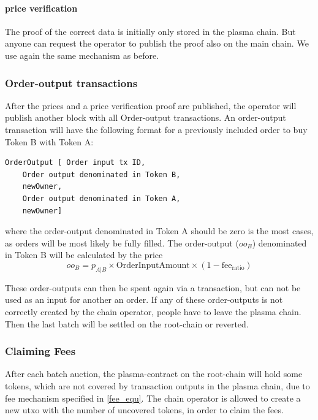 \documentclass[11pt,parskip=full]{scrartcl}%
\begin{document}
\paragraph{price verification}
The proof of the correct data is initially only stored in the plasma chain. 
But anyone can request the operator to publish the proof also on the main chain. 
We use again the same mechanism as before. 


\subsubsection{Order-output transactions}
After the prices and a price verification proof are published, the operator will publish another block with all Order-output transactions. 
An order-output transaction will have the following format for a previously included order to buy Token B with Token A:
\begin{lstlisting}
OrderOutput [ Order input tx ID,
    Order output denominated in Token B, 
    newOwner,
    Order output denominated in Token A,
    newOwner]

\end{lstlisting}
where the order-output denominated in Token A should be zero is the most cases, as orders will be most likely be fully filled. 
The order-output ($oo_B$) denominated in Token B will be calculated by the price 
\begin{equation}
  oo_B = p_{A|B} \times \text{OrderInputAmount} \times (1-\text{fee}_{\text{ratio}})
    \label{fee_equ}
\end{equation}

These order-outputs can then be spent again via a transaction, but can not be used as an input for another an order. 
If any of these order-outputs is not correctly created by the chain operator, people have to leave the plasma chain. 
Then the last batch will be settled on the root-chain or reverted. 

\subsubsection{Claiming Fees}
After each batch auction, the plasma-contract on the root-chain will hold some tokens, which are not covered by transaction outputs in the plasma chain, due to fee mechanism specified in \ref{fee_equ}. 
The chain operator is allowed to create a new utxo with the number of uncovered tokens, in order to claim the fees. 
\end{document}
